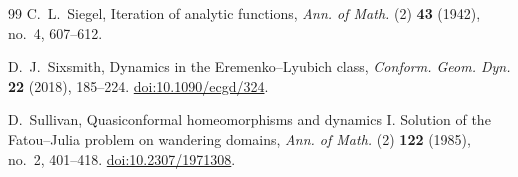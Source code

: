 \documentclass[11pt,reqno]{amsart}
\theoremstyle{definition}
\numberwithin{equation}{section}
\begin{document}
\begin{thebibliography}{99}
C.~L.~Siegel, Iteration of analytic functions,
\emph{Ann. of Math.} (2) \textbf{43} (1942), no.~4, 607--612.

D.~J.~Sixsmith, Dynamics in the Eremenko--Lyubich class,
\emph{Conform. Geom. Dyn.} \textbf{22} (2018), 185--224.
\href{https://doi.org/10.1090/ecgd/324}{doi:10.1090/ecgd/324}.

D.~Sullivan, Quasiconformal homeomorphisms and dynamics I. Solution of the Fatou--Julia problem on wandering domains,
\emph{Ann. of Math.} (2) \textbf{122} (1985), no.~2, 401--418.
\href{https://doi.org/10.2307/1971308}{doi:10.2307/1971308}.
\end{thebibliography}
\end{document}
